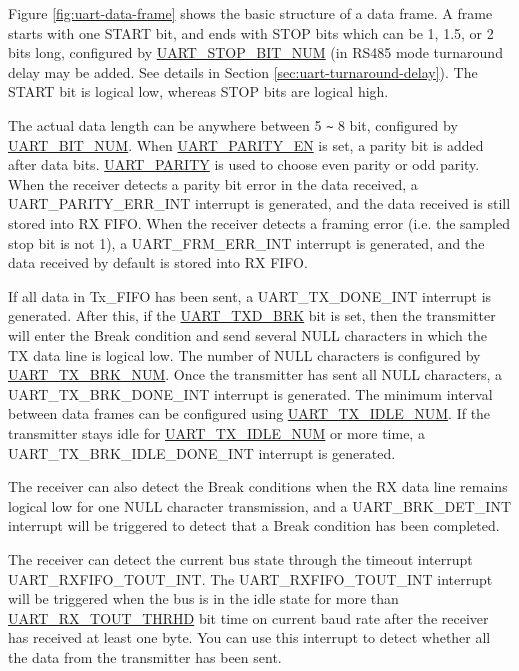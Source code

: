 \documentclass[main\_\_EN.tex]{subfiles}
\begin{document}
Figure \ref{fig:uart-data-frame} shows the basic structure of a data frame. A frame starts with one START bit, and ends with STOP bits which can be 1, 1.5, or 2 bits long, configured by \hyperref[fielddesc:UARTSTOPBITNUM]{UART\_STOP\_BIT\_NUM} (in RS485 mode turnaround delay may be added. See details in Section \ref{sec:uart-turnaround-delay}). The START bit is logical low, whereas STOP bits are logical high.

The actual data length can be anywhere between 5 \verb+~+ 8 bit, configured by \hyperref[fielddesc:UARTBITNUM]{UART\_BIT\_NUM}. When \hyperref[fielddesc:UARTPARITYEN]{UART\_PARITY\_EN} is set, a parity bit is added after data bits. \hyperref[fielddesc:UARTPARITY]{UART\_PARITY} is used to choose even parity or odd parity. When the receiver detects a parity bit error in the data received, a UART\_PARITY\_ERR\_INT interrupt is generated, and the data received is still stored into RX FIFO. When the receiver detects a framing error (i.e. the sampled stop bit is not 1), a UART\_FRM\_ERR\_INT interrupt is generated, and the data received by default is stored into RX FIFO.

If all data in Tx\_FIFO has been sent, a UART\_TX\_DONE\_INT interrupt is generated. After this, if the \hyperref[fielddesc:UARTTXDBRK]{UART\_TXD\_BRK} bit is set, then the transmitter will enter the Break condition and send several NULL characters in which the TX data line is logical low. The number of NULL characters is configured by \hyperref[fielddesc:UARTTXBRKNUM]{UART\_TX\_BRK\_NUM}. Once the transmitter has sent all NULL characters, a UART\_TX\_BRK\_DONE\_INT interrupt is generated. The minimum interval between data frames can be configured using \hyperref[fielddesc:UARTTXIDLENUM]{UART\_TX\_IDLE\_NUM}. If the transmitter stays idle for \hyperref[fielddesc:UARTTXIDLENUM]{UART\_TX\_IDLE\_NUM} or more time, a UART\_TX\_BRK\_IDLE\_DONE\_INT interrupt is generated.

The receiver can also detect the Break conditions when the RX data line remains logical low for one NULL character transmission, and a UART\_BRK\_DET\_INT interrupt will be triggered to detect that a Break condition has been completed.

The receiver can detect the current bus state through the timeout interrupt UART\_RXFIFO\_TOUT\_INT. The UART\_RXFIFO\_TOUT\_INT interrupt will be triggered when the bus is in the idle state for more than \hyperref[fielddesc:UARTRXTOUTTHRHD]{UART\_RX\_TOUT\_THRHD} bit time on current baud rate after the receiver has received at least one byte. You can use this interrupt to detect whether all the data from the transmitter has been sent.
\end{document}
